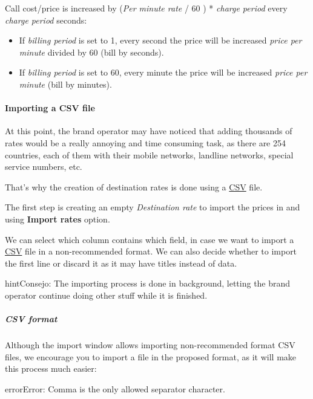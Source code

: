 \documentclass[letterpaper,10pt,spanish]{sphinxmanual}
\begin{document}
Call cost/price is increased by (\emph{Per minute rate} / 60 ) * \emph{charge period} every \emph{charge period} seconds:
\begin{itemize}
\item {} 
If \emph{billing period} is set to 1, every second the price will be increased
\emph{price per minute} divided by 60 (bill by seconds).

\item {} 
If \emph{billing period} is set to 60, every minute the price will be increased
\emph{price per minute} (bill by minutes).

\end{itemize}


\paragraph{Importing a CSV file}
\label{administration_portal/brand/billing/destination_rates:importing-a-csv-file}
At this point, the brand operator may have noticed that adding thousands
of rates would be a really annoying and time consuming task, as there
are 254 countries, each of them with their mobile networks, landline networks,
special service numbers, etc.

That's why the creation of destination rates is done using a
\href{https://es.wikipedia.org/wiki/CSV}{CSV} file.

The first step is creating an empty \emph{Destination rate} to import the prices in and using \textbf{Import rates} option.

We can select which column contains which field, in case we want to import a
\href{https://es.wikipedia.org/wiki/CSV}{CSV} file in a non-recommended format. We
can also decide whether to import the first line or discard it as it may have
titles instead of data.

\begin{notice}{hint}{Consejo:}
The importing process is done in background, letting the brand operator
continue doing other stuff while it is finished.
\end{notice}


\subparagraph{CSV format}
\label{administration_portal/brand/billing/destination_rates:csv-format}
Although the import window allows importing non-recommended format CSV files,
we encourage you to import a file in the proposed format, as it will make
this process much easier:

\begin{notice}{error}{Error:}
Comma is the only allowed separator character.
\end{notice}
\end{document}
